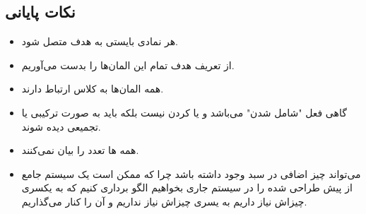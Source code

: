 \subsection{نکات پایانی}

\begin{itemize}
    \item هر نمادی بایستی به هدف متصل شود.
    \item از تعریف هدف تمام این المان‌ها را بدست می‌آوریم.
    \item همه المان‌ها به کلاس ارتباط دارند.
    \item گاهی فعل "شامل شدن" می‌باشد و  یا  کردن نیست بلکه
    باید به صورت ترکیبی یا تجمیعی دیده شوند.
    \item همه ها تعدد را بیان نمی‌کنند.
    \item می‌تواند چیز اضافی در سبد وجود داشته باشد چرا که ممکن است یک سیستم
    جامع از پیش طراحی شده را در سیستم جاری بخواهیم الگو برداری کنیم که به یکسری
    چیزاش نیاز داریم به یسری چیزاش نیاز نداریم و آن را کنار می‌گذاریم.
\end{itemize}